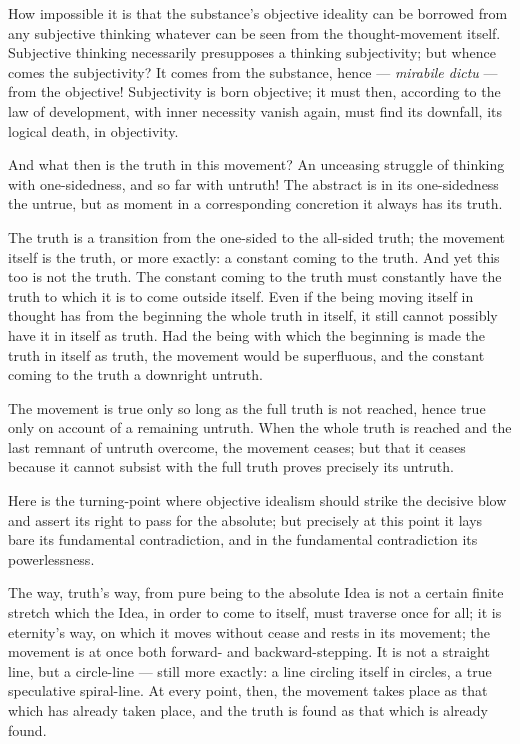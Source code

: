 \documentclass[12pt]{book}
\begin{document}
How impossible it is that the substance's objective ideality can be
borrowed from any subjective thinking whatever can be seen from the
thought-movement itself. Subjective thinking necessarily presupposes
a thinking subjectivity; but whence comes the subjectivity? It comes
from the substance, hence --- \textit{mirabile dictu} --- from the
objective! Subjectivity is born objective; it must then, according
to the law of development, with inner necessity vanish again, must
find its downfall, its logical death, in objectivity.

And what then is the truth in this movement? An unceasing struggle
of thinking with one-sidedness, and so far with untruth! The
abstract is in its one-sidedness the untrue, but as moment in a
corresponding concretion it always has its truth.

The truth is a transition from the one-sided to the all-sided truth;
the movement itself is the truth, or more exactly: a constant coming
to the truth. And yet this too is not the truth. The constant coming
to the truth must constantly have the truth to which it is to come
outside itself. Even if the being moving itself in thought has from
the beginning the whole truth in itself, it still cannot possibly
have it in itself as truth. Had the being with which the beginning
is made the truth in itself as truth, the movement would be
superfluous, and the constant coming to the truth a downright
untruth.

The movement is true only so long as the full truth is not reached,
hence true only on account of a remaining untruth. When the whole
truth is reached and the last remnant of untruth overcome, the
movement ceases; but that it ceases because it cannot subsist with
the full truth proves precisely its untruth.

Here is the turning-point where objective idealism should strike the
decisive blow and assert its right to
pass for the absolute; but precisely at this point it lays bare its
fundamental contradiction, and in the fundamental contradiction its
powerlessness.

The way, truth's way, from pure being to the absolute Idea is not a
certain finite stretch which the Idea, in order to come to itself,
must traverse once for all; it is eternity's way, on which it moves
without cease and rests in its movement; the movement is at once
both forward- and backward-stepping. It is not a straight line, but
a circle-line --- still more exactly: a line circling itself in
circles, a true speculative spiral-line. At every point, then, the
movement takes place as that which has already taken place, and the
truth is found as that which is already found.
\end{document}
